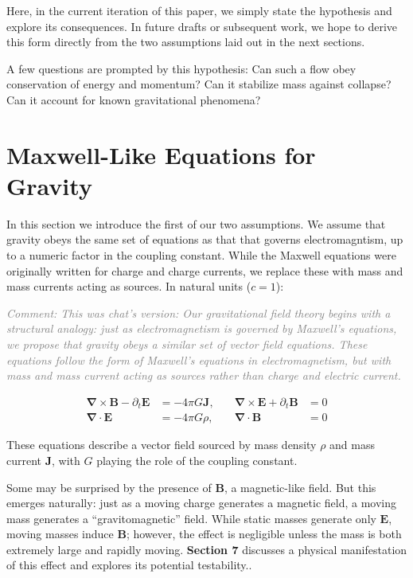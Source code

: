 \documentclass {article}
\renewcommand\vec{\mathbf}
\let\OldS\nabla
\renewcommand{\nabla}{\boldsymbol{\OldS}}
\newcommand{\comment}[1]{\textcolor{gray}{\small\textit{Comment: #1}}}
\begin{document}
Here, in the current iteration of this paper, we simply state the hypothesis and explore its consequences. In future drafts or subsequent work, we hope to derive this form directly from the two assumptions laid out in the next sections.

A few questions are prompted by this hypothesis: Can such a flow obey conservation of energy and momentum? Can it stabilize mass against collapse? Can it account for known gravitational phenomena?

\section{Maxwell-Like Equations for Gravity}

In this section we introduce the first of our two assumptions. We assume that gravity obeys the same set of  equations as that that governs electromagntism, up to a numeric factor in the coupling constant. While the Maxwell equations were originally written for charge and charge currents, we replace these with mass and  mass currents acting as sources.  In natural units (\( c = 1 \)):

\comment{This was chat's version: Our gravitational field theory begins with a structural analogy: just as electromagnetism is governed by Maxwell's equations, we propose that gravity obeys a similar set of vector field equations.  These equations follow the form of Maxwell's equations in electromagnetism, but with mass and mass current acting as sources rather than charge and electric current.}

\begin{equation}
\begin{aligned}
\nabla \times \vec{B} - \partial_t \vec{E} &= -4 \pi G \vec{J}, \quad 
&\nabla \times \vec{E} + \partial_t \vec{B} &= 0 \\
\nabla \cdot \vec{E} &= -4 \pi G \rho, \quad 
&\nabla \cdot \vec{B} &= 0
\end{aligned}
\end{equation}


These equations describe a vector field sourced by mass density \( \rho \) and mass current \( \vec{J} \), with \( G \) playing the role of the coupling constant. 

Some may be surprised by the presence of \( \vec{B} \), a magnetic-like field. But this emerges naturally: just as a moving charge generates a magnetic field, a moving mass generates a “gravitomagnetic” field. While static masses generate only \( \vec{E}\), moving masses induce \( \vec{B} \); however, the effect is negligible unless the mass is both extremely large and rapidly moving. \textbf{Section 7} discusses a physical manifestation of this effect and explores its potential testability..
\end{document}
